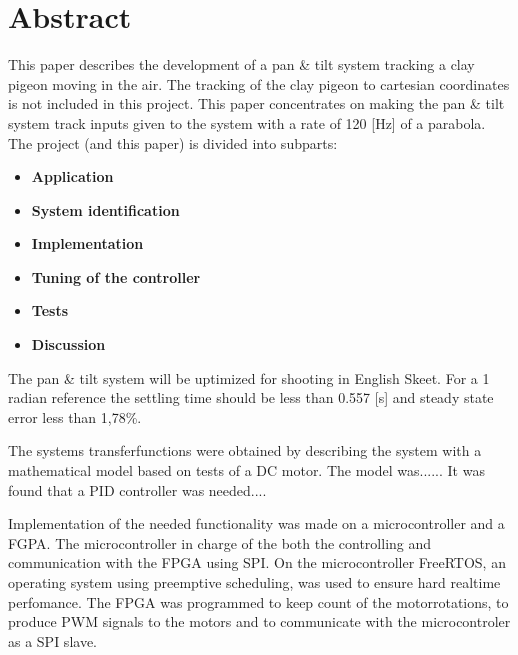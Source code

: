 
\setcounter{page}{1}
\section*{Abstract}

This paper describes the development of a pan \& tilt system tracking a clay 
pigeon moving in the air. 
The tracking of the clay pigeon to cartesian coordinates is not included in this 
project. This paper concentrates on making the pan \& tilt system track inputs 
given to the system with a rate of 120 [Hz] of a parabola.
The project (and this paper) is divided into subparts: 
 
\begin{itemize}
  \item \textbf{Application}
  \item \textbf{System identification} 
  \item \textbf{Implementation}
  \item \textbf{Tuning of the controller} 
  \item \textbf{Tests} 
  \item \textbf{Discussion} 
\end{itemize}

The pan \& tilt system will be uptimized for shooting in English Skeet. For a 1 
radian reference the settling time should be less than 0.557 [s] and steady 
state error less than 1,78\%.

The systems transferfunctions were obtained by describing the system with a 
mathematical model based on tests of a DC motor. The model was...... It was 
found that a PID controller was needed....

Implementation of the needed functionality was made on a microcontroller and a 
FGPA. The microcontroller in charge of the both the controlling and 
communication with the FPGA using SPI. 
On the microcontroller FreeRTOS, an operating system using preemptive scheduling, was used 
to ensure hard realtime perfomance.
The FPGA was programmed to keep count of the motorrotations, to produce PWM 
signals to the motors and to communicate with the microcontroler as a SPI slave.

